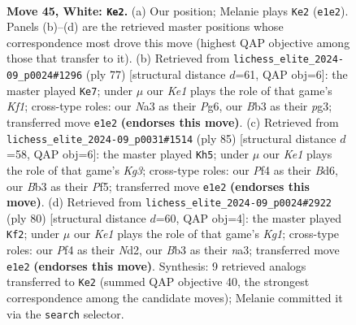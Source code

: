 \documentclass[11pt]{article}
\begin{document}
\clearpage

\begin{figure}[p]\centering
\begin{subfigure}{0.46\textwidth}\centering
\resizebox{\linewidth}{!}{%
\newchessgame
\chessboard[
  setfen={1rb3k1/p2p4/1pp5/5p1p/1PPPnP2/NB6/P6P/2R1K3 w - - 7 45},
  showmover=false,
  pgfstyle=straightmove, color=movearrow, markmove={e1-e2}
]}
\caption{}
\end{subfigure}\hfill
\begin{subfigure}{0.46\textwidth}\centering
\resizebox{\linewidth}{!}{%
\newchessgame
\chessboard[
  setfen={3r1k2/1p5p/p1pn2p1/P4p2/1PP5/4KPP1/7P/2R2B2 b - - 3 39},
  showmover=false,
  pgfstyle=straightmove, color=movearrow, markmove={f8-e7}
]}
\caption{}
\end{subfigure}
\\[4pt]
\begin{subfigure}{0.46\textwidth}\centering
\resizebox{\linewidth}{!}{%
\newchessgame
\chessboard[
  setfen={6r1/2p2p2/3b2k1/3P1p2/pp1B1P2/3K2PP/PP6/7R b - - 1 43},
  showmover=false,
  pgfstyle=straightmove, color=movearrow, markmove={g6-h5}
]}
\caption{}
\end{subfigure}\hfill
\begin{subfigure}{0.46\textwidth}\centering
\resizebox{\linewidth}{!}{%
\newchessgame
\chessboard[
  setfen={8/4r1kp/1NR3p1/p3pp2/P7/n3PPPb/3N3P/6K1 w - - 1 41},
  showmover=false,
  pgfstyle=straightmove, color=movearrow, markmove={g1-f2}
]}
\caption{}
\end{subfigure}
\caption{\textbf{Move 45, White: \texttt{Ke2}.} (a) Our position; Melanie plays \texttt{Ke2} (\texttt{e1e2}). Panels (b)--(d) are the retrieved master positions whose correspondence most drove this move (highest QAP objective among those that transfer to it). (b) Retrieved from \texttt{lichess\_elite\_2024-09\_p0024\#1296} (ply 77) [structural distance $d$=61, QAP obj=6]: the master played \texttt{Ke7}; under $\mu$ our \emph{Ke1} plays the role of that game's \emph{Kf1}; cross-type roles: our \emph{N}a3 as their \emph{P}g6, our \emph{B}b3 as their \emph{p}g3; transferred move \texttt{e1e2} \textbf{(endorses this move)}. (c) Retrieved from \texttt{lichess\_elite\_2024-09\_p0031\#1514} (ply 85) [structural distance $d$=58, QAP obj=6]: the master played \texttt{Kh5}; under $\mu$ our \emph{Ke1} plays the role of that game's \emph{Kg3}; cross-type roles: our \emph{P}f4 as their \emph{B}d6, our \emph{B}b3 as their \emph{P}f5; transferred move \texttt{e1e2} \textbf{(endorses this move)}. (d) Retrieved from \texttt{lichess\_elite\_2024-09\_p0024\#2922} (ply 80) [structural distance $d$=60, QAP obj=4]: the master played \texttt{Kf2}; under $\mu$ our \emph{Ke1} plays the role of that game's \emph{Kg1}; cross-type roles: our \emph{P}f4 as their \emph{N}d2, our \emph{B}b3 as their \emph{n}a3; transferred move \texttt{e1e2} \textbf{(endorses this move)}. Synthesis: 9 retrieved analogs transferred to \texttt{Ke2} (summed QAP objective 40, the strongest correspondence among the candidate moves); Melanie committed it via the \texttt{search} selector.}
\label{fig:thought-m88}
\end{figure}
\end{document}
